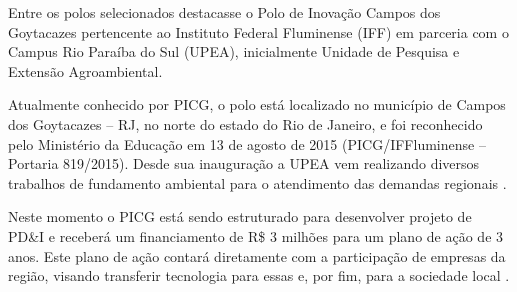 Entre os polos selecionados destacasse o Polo de Inovação Campos dos Goytacazes pertencente ao Instituto Federal Fluminense (IFF) em parceria com o Campus Rio Paraíba do Sul (UPEA), inicialmente Unidade de Pesquisa e Extensão Agroambiental.

Atualmente conhecido por PICG, o polo está localizado no município de Campos dos Goytacazes – RJ, no norte do estado do Rio de Janeiro, e foi reconhecido pelo Ministério da Educação em 13 de agosto de 2015 (PICG/IFFluminense – Portaria 819/2015). Desde sua inauguração a UPEA vem  realizando diversos trabalhos de fundamento ambiental para o atendimento das demandas regionais \cite{embrapiiff}.

Neste momento o PICG está sendo estruturado para desenvolver projeto de PD\&I e receberá um financiamento de R\$ 3 milhões para um plano de ação de 3 anos. Este plano de ação contará diretamente com a participação de empresas da região, visando transferir tecnologia para essas e, por fim, para a sociedade local \cite{embrapiiff}.
